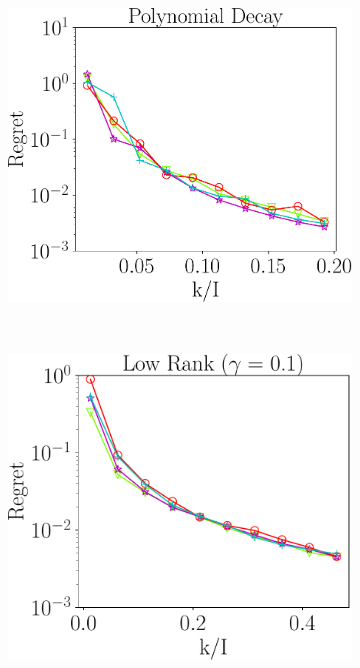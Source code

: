 \begin{figure}
\begin{subfigure}{0.3\textwidth}
	\end{subfigure}
	\begin{subfigure}{0.3\textwidth}
		\includegraphics[scale = 0.24]{figure/fig2_spd_400.pdf}
	\end{subfigure}\\
	\begin{subfigure}{0.3\textwidth}
		\includegraphics[scale = 0.24]{figure/fig2_lk_mnoise_400.pdf}
	\end{subfigure}

\end{figure}
